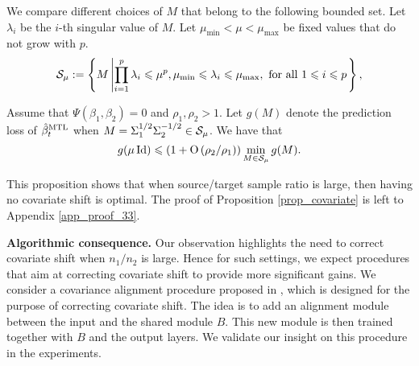 We compare different choices of $M$ that belong to the following bounded set.
Let $\lambda_i$ be the $i$-th singular value of $M$.
Let $\mu_{\min} < \mu < \mu_{\max}$ be fixed values that do not grow with $p$.
\vspace{-0.025in}
{\small\begin{align*}
		\mathcal{S}_{\mu}:=\left\{ M \left| \prod_{i=1}^p \lambda_i \leqslant \mu^p, \mu_{\min} \leqslant \lambda_i\leqslant \mu_{\max}, \text{ for all } 1\leqslant i\leqslant p\right. \right\},
\end{align*}}
\begin{proposition}\label{prop_covariate}
	Assume that $\Psi(\beta_1, \beta_2) = 0$ and $\rho_1, \rho_2>1$.
	Let $g(M)$ denote the prediction loss of $\hat{\beta}_t^{\text{MTL}}$ when $M = \Sigma_1^{1/2}\Sigma_2^{-1/2} \in\mathcal{S}_{\mu}$.
	We have that
	{\small\[ g(\mu\operatorname{Id}) \leqslant \left({1+ \operatorname{O}\left({\rho_2}/{\rho_1}  \right)}\right) \min_{M\in\mathcal{S}_{\mu}} g(M). \]}
\end{proposition}
This proposition shows that when source/target sample ratio is large, then having no covariate shift is optimal.
The proof of Proposition \ref{prop_covariate} is left to Appendix \ref{app_proof_33}.




\textbf{Algorithmic consequence.}
Our observation highlights the need to correct covariate shift when $n_1 / n_2$ is large.
Hence for such settings, we expect procedures that aim at correcting covariate shift to provide more significant gains.
We consider a covariance alignment procedure proposed in \cite{WZR20}, which is designed for the purpose of correcting covariate shift.
The idea is to add an alignment module between the input and the shared module $B$.
This new module is then trained together with $B$ and the output layers.
We validate our insight on this procedure in the experiments.



